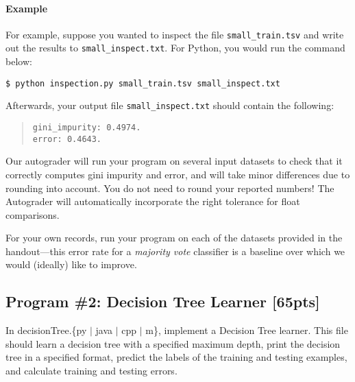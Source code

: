\paragraph{Example}

For example, suppose you wanted to inspect the file \lstinline{small_train.tsv} and write out the results to \lstinline{small_inspect.txt}. For Python, you would run the command below:
%
\begin{lstlisting}[language=Shell]
$ python inspection.py small_train.tsv small_inspect.txt
\end{lstlisting}
%
Afterwards, your output file \lstinline{small_inspect.txt} should contain the following:
%
\begin{quote}
\begin{verbatim}
gini_impurity: 0.4974.
error: 0.4643.
\end{verbatim}
\end{quote}
%
Our autograder will run your program on several input datasets to check that it correctly computes gini impurity and error, and will take minor differences due to rounding into account. You do not need to round your reported numbers! The Autograder will automatically incorporate the right tolerance for float comparisons.

\begin{notebox}
For your own records, run your program on each of the datasets provided in the handout---this error rate for a \emph{majority vote} classifier is a baseline over which we would (ideally) like to improve.
\end{notebox}

\newpage
\subsection{Program \#2: Decision Tree Learner [65pts]}
\label{sec:decisiontree}

In decisionTree.\{py $\mid$ java $\mid$ cpp $\mid$ m\}, implement a Decision Tree learner. This file should learn a decision tree with a specified maximum depth, print the decision tree in a specified format, predict the labels of the training and testing examples, and calculate training and testing errors.

